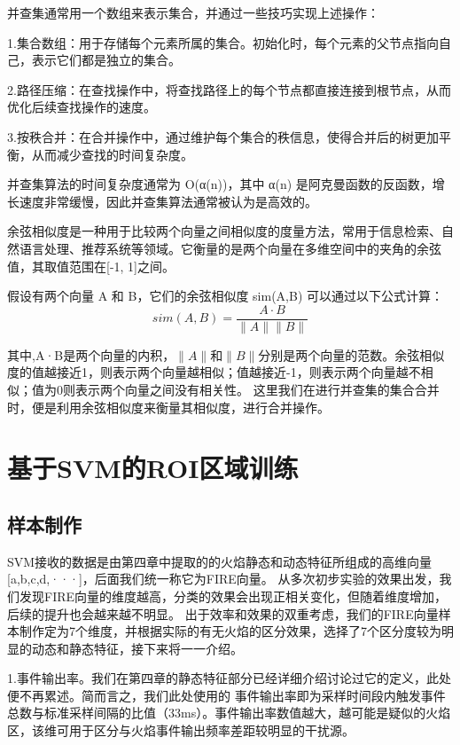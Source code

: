 并查集通常用一个数组来表示集合，并通过一些技巧实现上述操作：

1.集合数组：用于存储每个元素所属的集合。初始化时，每个元素的父节点指向自己，表示它们都是独立的集合。

2.路径压缩：在查找操作中，将查找路径上的每个节点都直接连接到根节点，从而优化后续查找操作的速度。

3.按秩合并：在合并操作中，通过维护每个集合的秩信息，使得合并后的树更加平衡，从而减少查找的时间复杂度。

并查集算法的时间复杂度通常为 O(α(n))，其中 α(n) 是阿克曼函数的反函数，增长速度非常缓慢，因此并查集算法通常被认为是高效的。

余弦相似度是一种用于比较两个向量之间相似度的度量方法，常用于信息检索、自然语言处理、推荐系统等领域。它衡量的是两个向量在多维空间中的夹角的余弦值，其取值范围在[-1, 1]之间。

假设有两个向量 A 和 B，它们的余弦相似度 sim(A,B) 可以通过以下公式计算：
\begin{equation} 
    sim(A,B)=\frac{A·B}{\lVert A \rVert \lVert B \rVert}
\end{equation}

其中,A·B是两个向量的内积，$\lVert A \rVert$和$\lVert B \rVert$分别是两个向量的范数。余弦相似度的值越接近1，则表示两个向量越相似；值越接近-1，则表示两个向量越不相似；值为0则表示两个向量之间没有相关性。
这里我们在进行并查集的集合合并时，便是利用余弦相似度来衡量其相似度，进行合并操作。


\section{基于SVM的ROI区域训练}
\subsection{样本制作}
SVM接收的数据是由第四章中提取的的火焰静态和动态特征所组成的高维向量[a,b,c,d,···]，后面我们统一称它为FIRE向量。
从多次初步实验的效果出发，我们发现FIRE向量的维度越高，分类的效果会出现正相关变化，但随着维度增加，后续的提升也会越来越不明显。
出于效率和效果的双重考虑，我们的FIRE向量样本制作定为7个维度，并根据实际的有无火焰的区分效果，选择了7个区分度较为明显的动态和静态特征，接下来将一一介绍。

1.事件输出率。我们在第四章的静态特征部分已经详细介绍讨论过它的定义，此处便不再累述。简而言之，我们此处使用的
事件输出率即为采样时间段内触发事件总数与标准采样间隔的比值（33ms）。事件输出率数值越大，越可能是疑似的火焰区，该维可用于区分与火焰事件输出频率差距较明显的干扰源。

